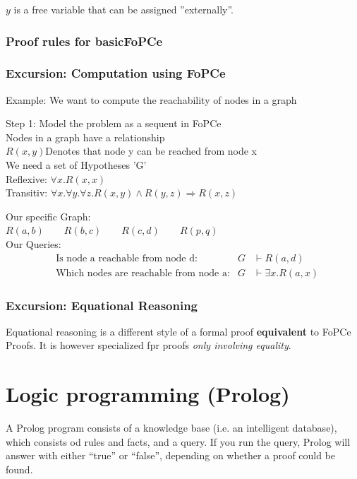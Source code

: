 $y$ is a free variable that can be assigned ''externally''.

\subsubsection{Proof rules for basicFoPCe}


\subsubsection{Excursion: Computation using FoPCe}
Example: We want to compute the reachability of nodes in a graph %

Step 1: Model the problem as a sequent in FoPCe \\

Nodes in a graph have a relationship \\
$R(x,y)$\qquad Denotes that node y can be reached from node x\\

We need a set of Hypotheses 'G' \\
Reflexive: $\forall x. R(x,x)$ \\
Transitiv: $\forall x.\forall y.\forall z. R(x,y) \land R(y,z) \Rightarrow R(x,z)$

Our specific Graph:\\
$R(a,b) \qquad R(b,c) \qquad R(c,d) \qquad R(p,q)$\\

Our Queries: \\
\begin{align*}
	&\text{Is node a reachable from node d:} &G &\vdash R(a,d)\\
	&\text{Which nodes are reachable from node a:} &G &\vdash \exists x.R(a,x)
\end{align*}

\subsubsection{Excursion: Equational Reasoning}
Equational reasoning is a different style of a formal proof \textbf{equivalent} to FoPCe Proofs. It is however specialized fpr proofs \emph{only involving equality}.

\section{Logic programming (Prolog)}
A Prolog program consists of a knowledge base (i.e. an intelligent database), which consists od rules and facts, and a query.
If you run the query, Prolog will answer with either “true” or “false”, depending on whether a proof could be found.
